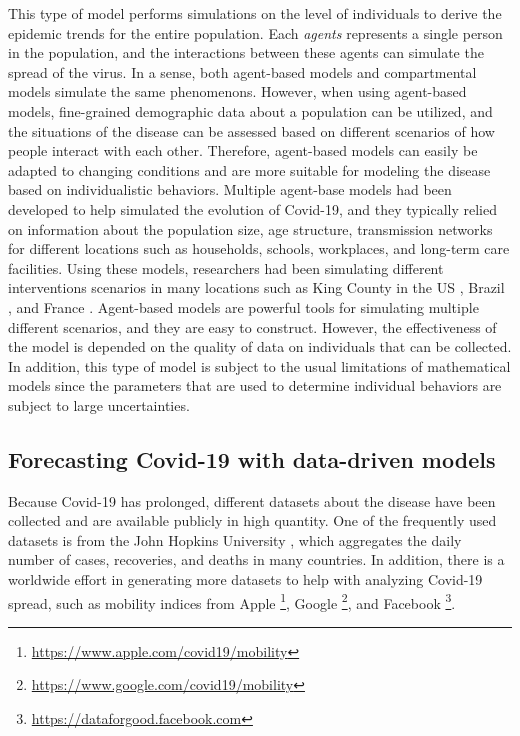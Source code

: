 This type of model performs simulations on the level of individuals to derive the epidemic trends for the entire population.
Each \textit{agents} represents a single person in the population, and the interactions between these agents can simulate the spread of the virus.
In a sense, both agent-based models and compartmental models simulate the same phenomenons.
However, when using agent-based models, fine-grained demographic data about a population can be utilized, and the situations of the disease can be assessed based on different scenarios of how people interact with each other.
Therefore, agent-based models can easily be adapted to changing conditions and are more suitable for modeling the disease based on individualistic behaviors.
Multiple agent-base models had been developed to help simulated the evolution of Covid-19, and they typically relied on information about the population size, age structure, transmission networks for different locations such as households, schools, workplaces, and long-term care facilities.
Using these models, researchers had been simulating different interventions scenarios in many locations such as King County in the \gls{US} \cite{kerrCovasimAgentbasedModel2021}, Brazil \cite{silvaCOVIDABSAgentbasedModel2020}, and France \cite{hoertelStochasticAgentbasedModel2020}.
Agent-based models are powerful tools for simulating multiple different scenarios, and they are easy to construct.
However, the effectiveness of the model is depended on the quality of data on individuals that can be collected.
In addition, this type of model is subject to the usual limitations of mathematical models since the parameters that are used to determine individual behaviors are subject to large uncertainties.

\subsection{Forecasting Covid-19 with data-driven models}

Because Covid-19 has prolonged, different datasets about the disease have been collected and are available publicly in high quantity.
One of the frequently used datasets is from the John Hopkins University \cite{dongInteractiveWebbasedDashboard2020}, which aggregates the daily number of cases, recoveries, and deaths in many countries.
In addition, there is a worldwide effort in generating more datasets to help with analyzing Covid-19 spread, such as mobility indices from Apple \footnote{\url{https://www.apple.com/covid19/mobility}}, Google \footnote{\url{https://www.google.com/covid19/mobility}}, and Facebook \footnote{\url{https://dataforgood.facebook.com}}.

